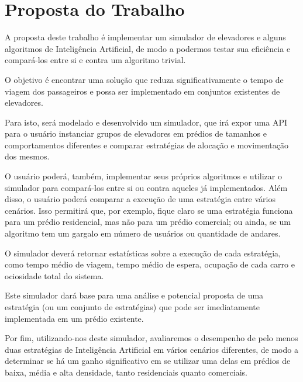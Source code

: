 \chapter{\label{chap:proposal}Proposta do Trabalho}

A proposta deste trabalho é implementar um simulador de elevadores e alguns
algoritmos de Inteligência Artificial, de modo a podermos testar sua eficiência
e compará-los entre si e contra um algoritmo trivial.

O objetivo é encontrar uma solução que reduza significativamente o tempo de
viagem dos passageiros e possa ser implementado em conjuntos existentes de
elevadores.

Para isto, será modelado e desenvolvido um simulador, que irá expor uma API para
o usuário instanciar grupos de elevadores em prédios de tamanhos e
comportamentos diferentes e comparar estratégias de alocação e movimentação dos
mesmos.

O usuário poderá, também, implementar seus próprios algoritmos e utilizar o
simulador para compará-los entre si ou contra aqueles já implementados. Além
disso, o usuário poderá comparar a execução de uma estratégia entre vários
cenários. Isso permitirá que, por exemplo, fique claro se uma estratégia
funciona para um prédio residencial, mas não para um prédio comercial; ou ainda,
se um algoritmo tem um gargalo em número de usuários ou quantidade de andares.

O simulador deverá retornar estatísticas sobre a execução de cada estratégia,
como tempo médio de viagem, tempo médio de espera, ocupação de cada carro e
ociosidade total do sistema.

Este simulador dará base para uma análise e potencial proposta de uma estratégia
(ou um conjunto de estratégias) que pode ser imediatamente implementada em um
prédio existente.

Por fim, utilizando-nos deste simulador, avaliaremos o desempenho de pelo menos
duas estratégias de Inteligência Artificial em vários cenários
diferentes, de modo a determinar se há um ganho significativo em se utilizar uma
delas em prédios de baixa, média e alta densidade, tanto residenciais quanto comerciais.